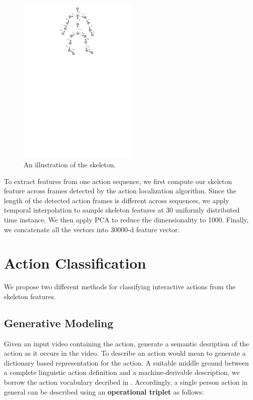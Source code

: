 \documentclass[10pt,twocolumn,letterpaper]{article}
\begin{document}
\begin{figure}[htb]
\begin{center}
\includegraphics[width=2.3in]{skeleton.pdf}
\caption{An illustration of the skeleton. \label{fig:skeleton}}
\end{center}
\end{figure}

To extract features from one action sequence, we first compute our skeleton feature across frames detected by the action localization algorithm. Since the length of the detected action frames is different across sequences, we apply temporal interpolation to sample skeleton features at 30 uniformly distributed time instance. We then apply PCA to reduce the dimensionality to 1000. Finally, we concatenate all the vectors into 30000-d feature vector.

\section{Action Classification}
We propose two different methods for classifying interactive actions from the skeleton features.

\subsection{Generative Modeling}
Given an input video containing the action, generate a semantic desription of the action as it occurs in the video. To describe an action would mean to generate a dictionary based representation for the action. A suitable middle ground between a complete linguistic action definition and a machine-derivable description, we borrow the action vocabulary decribed in \cite{SUHA}. Accordingly, a single person action in general can be described using an \textbf{operational triplet} as follows:
\end{document}
